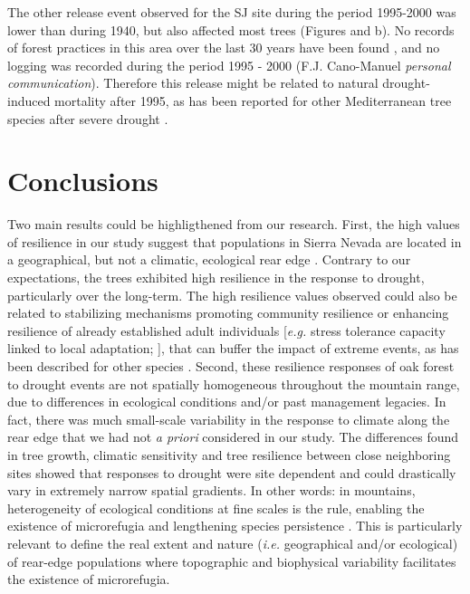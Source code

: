 The other release event observed for the SJ site during the period 1995-2000 was lower than during 1940, but also affected most trees (Figures  and  b). No records of forest practices in this area over the last 30 years have been found \autocite{Bonetetal2016HistorySierra}, and no logging was recorded during the period 1995 - 2000 (F.J. Cano-Manuel \emph{personal communication}). Therefore this release might be related to natural drought-induced mortality after 1995, as has been reported for other Mediterranean tree species after severe drought \autocites[\emph{e.g.}][]{Penuelasetal2001SevereDrought,Lloretetal2004CanopyRecovery}.

\section{Conclusions}\label{sec:dendroConclusions}
Two main results could be highligthened from our research. First, the high values of resilience in our study suggest that \Qpy populations in Sierra Nevada are located in a geographical, but not a climatic, ecological rear edge \autocites[\emph{sensu}][]{MartinezVilalta2018RearWindow,VilaCabreraetal2019RefiningPredictions}. Contrary to our expectations, the trees exhibited high resilience in the response to drought, particularly over the long-term. The high resilience values observed could also be related to stabilizing mechanisms promoting community resilience or enhancing resilience of already established adult individuals {[}\emph{e.g.} stress tolerance capacity linked to local adaptation; \textcite{Lloretetal2012ExtremeClimatic}{]}, that can buffer the impact of extreme events, as has been described for other species \autocite[\emph{e.g.} \emph{Pinus sylvestris},][]{HerreroZamora2014PlantResponses}. Second, these resilience responses of oak forest to drought events are not spatially homogeneous throughout the mountain range, due to differences in ecological conditions and/or past management legacies. In fact, there was much small-scale variability in the response to climate along the rear edge that we had not \emph{a priori} considered in our study. The differences found in tree growth, climatic sensitivity and tree resilience between close neighboring sites showed that responses to drought were site dependent and could drastically vary in extremely narrow spatial gradients. In other words: in mountains, heterogeneity of ecological conditions at fine scales is the rule, enabling the existence of microrefugia and lengthening species persistence \autocite{Olaldeetal2002WhiteOaks,SerraDiazetal2015DisturbanceClimate}. This is particularly relevant to define the real extent and nature (\emph{i.e.} geographical and/or ecological) of rear-edge populations where topographic and biophysical variability facilitates the existence of microrefugia.

